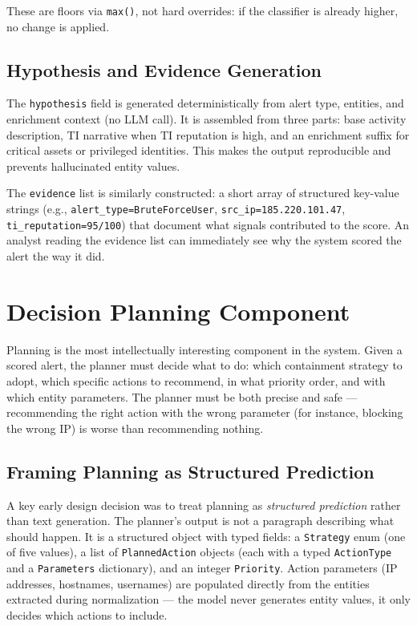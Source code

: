 These are floors via \texttt{max()}, not hard overrides: if the classifier is already higher, no change is applied.

\subsection{Hypothesis and Evidence Generation}

The \texttt{hypothesis} field is generated deterministically from alert type, entities, and enrichment context (no LLM call). It is assembled from three parts: base activity description, TI narrative when TI reputation is high, and an enrichment suffix for critical assets or privileged identities. This makes the output reproducible and prevents hallucinated entity values.

The \texttt{evidence} list is similarly constructed: a short array of structured key-value strings (e.g., \texttt{alert\_type=BruteForceUser}, \texttt{src\_ip=185.220.101.47}, \texttt{ti\_reputation=95/100}) that document what signals contributed to the score. An analyst reading the evidence list can immediately see why the system scored the alert the way it did.

\section{Decision Planning Component}
\label{sec:impl-planning}

Planning is the most intellectually interesting component in the system. Given a scored alert, the planner must decide what to do: which containment strategy to adopt, which specific actions to recommend, in what priority order, and with which entity parameters. The planner must be both precise and safe --- recommending the right action with the wrong parameter (for instance, blocking the wrong IP) is worse than recommending nothing.

\subsection{Framing Planning as Structured Prediction}

A key early design decision was to treat planning as \emph{structured prediction} rather than text generation. The planner's output is not a paragraph describing what should happen. It is a structured object with typed fields: a \texttt{Strategy} enum (one of five values), a list of \texttt{PlannedAction} objects (each with a typed \texttt{ActionType} and a \texttt{Parameters} dictionary), and an integer \texttt{Priority}. Action parameters (IP addresses, hostnames, usernames) are populated directly from the entities extracted during normalization --- the model never generates entity values, it only decides which actions to include.

